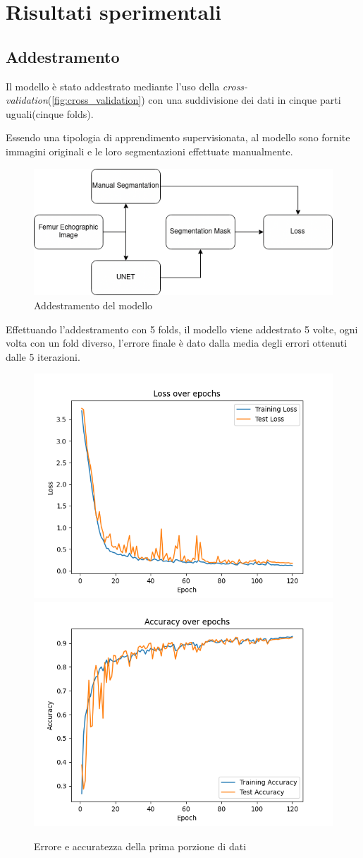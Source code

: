 \chapter{Risultati sperimentali} %
\label{chap:Risultati sperimentali}

\section{Addestramento} %
\label{sec:Addestramento}

Il modello \`e stato addestrato mediante l'uso della \textit{cross-validation}(\autoref{fig:cross_validation})
con una suddivisione dei dati in cinque parti uguali(cinque folds).

Essendo una tipologia di apprendimento supervisionata, al modello sono fornite immagini
originali e le loro segmentazioni effettuate manualmente.

\begin{figure}[H]
    \centering
    \includegraphics[width=0.7\columnwidth]{Immagini/training.png}
    \caption{Addestramento del modello}
    \label{fig:addestramento del modello}
\end{figure}


Effettuando l'addestramento con 5 folds, il modello viene addestrato 5 volte, ogni volta con un fold diverso,
l'errore finale \`e dato dalla media degli errori ottenuti dalle 5 iterazioni.

\begin{figure}[H]
    \centering
    \includegraphics[width=0.4\columnwidth]{Immagini/fold_0_loss.png} \includegraphics[width=0.4\columnwidth]{Immagini/fold_0_accuracy.png}
    \caption{Errore e accuratezza della prima porzione di dati}
    \label{fig:loss e accuratezza della prima porzione di dati}
\end{figure}

